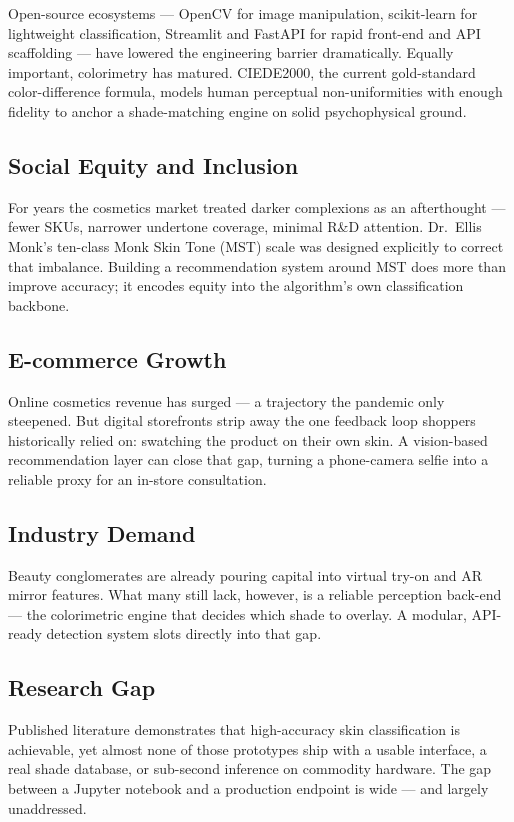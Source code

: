 Open-source ecosystems — OpenCV for image manipulation, scikit-learn for lightweight classification, Streamlit and FastAPI for rapid front-end and API scaffolding — have lowered the engineering barrier dramatically. Equally important, colorimetry has matured. CIEDE2000, the current gold-standard color-difference formula, models human perceptual non-uniformities with enough fidelity to anchor a shade-matching engine on solid psychophysical ground.

\subsection{Social Equity and Inclusion}

For years the cosmetics market treated darker complexions as an afterthought — fewer SKUs, narrower undertone coverage, minimal R\&D attention. Dr.\ Ellis Monk's ten-class Monk Skin Tone (MST) scale was designed explicitly to correct that imbalance. Building a recommendation system around MST does more than improve accuracy; it encodes equity into the algorithm's own classification backbone.

\subsection{E-commerce Growth}

Online cosmetics revenue has surged — a trajectory the pandemic only steepened. But digital storefronts strip away the one feedback loop shoppers historically relied on: swatching the product on their own skin. A vision-based recommendation layer can close that gap, turning a phone-camera selfie into a reliable proxy for an in-store consultation.

\subsection{Industry Demand}

Beauty conglomerates are already pouring capital into virtual try-on and AR mirror features. What many still lack, however, is a reliable perception back-end — the colorimetric engine that decides which shade to overlay. A modular, API-ready detection system slots directly into that gap.

\subsection{Research Gap}

Published literature demonstrates that high-accuracy skin classification is achievable, yet almost none of those prototypes ship with a usable interface, a real shade database, or sub-second inference on commodity hardware. The gap between a Jupyter notebook and a production endpoint is wide — and largely unaddressed.

